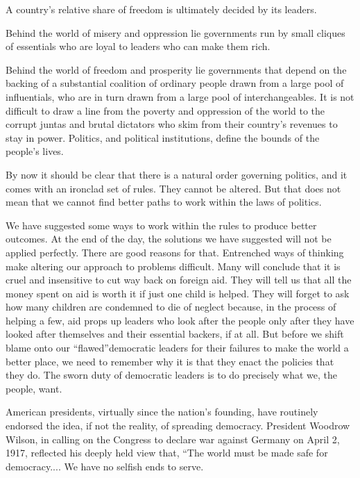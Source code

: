 \documentclass[10pt]{article}
\begin{document}
{\large A country's relative share of freedom is ultimately decided by its
leaders.}

{\large Behind the world of misery and oppression lie governments run by small
cliques of essentials who are loyal to leaders who can make them rich.}

{\large Behind the world of freedom and prosperity lie governments that depend
on the backing of a substantial coalition of ordinary people drawn from a large
pool of influentials, who are in turn drawn from a large pool of
interchangeables. It is not difficult to draw a line from the poverty and
oppression of the world to the corrupt juntas and brutal dictators who skim from
their country's revenues to stay in power. Politics, and political institutions,
define the bounds of the people's lives.}

{\large By now it should be clear that there is a natural order governing
politics, and it comes with an ironclad set of rules. They cannot be altered. But
that does not mean that we cannot find better paths to work within the laws of
politics.}

{\large We have suggested some ways to work within the rules to produce better
outcomes. At the end of the day, the solutions we have suggested will not be
applied perfectly. There are good reasons for that. Entrenched ways of thinking
make altering our approach to problems difficult. Many will conclude that it is
cruel and insensitive to cut way back on foreign aid. They will tell us that all
the money spent on aid is worth it if just one child is helped. They will forget
to ask how many children are condemned to die of neglect because, in the process
of helping a few, aid props up leaders who look after the people only after they
have looked after themselves and their essential backers, if at all. But before
we shift blame onto our ``flawed''democratic leaders for their failures to make
the world a better place, we need to remember why it is that they enact the
policies that they do. The sworn duty of democratic leaders is to do precisely
what we, the people, want.}

{\large American presidents, virtually since the nation's founding, have
routinely endorsed the idea, if not the reality, of spreading democracy.
President Woodrow Wilson, in calling on the Congress to declare war against
Germany on April 2, 1917, reflected his deeply held view that, ``The world must
be made safe for democracy.... We have no selfish ends to serve.}
\end{document}
